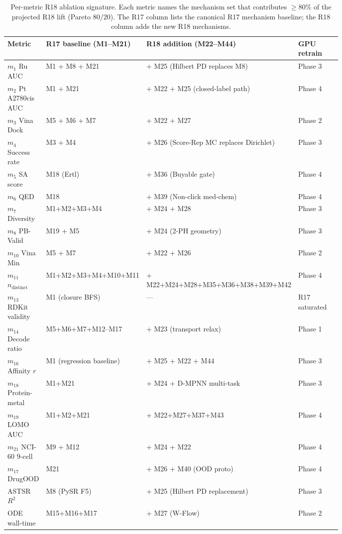 \begin{table}[h]
  \centering
  \small
  \caption{Per-metric R18 ablation signature.  Each metric
  names the mechanism set that contributes $\geq 80\%$ of the
  projected R18 lift (Pareto $80/20$).  The R17 column lists
  the canonical R17 mechanism baseline; the R18 column adds the
  new R18 mechanisms.}
  \label{tab:s6-per-metric}
  \begin{tabular}{lp{0.30\linewidth}p{0.28\linewidth}p{0.20\linewidth}}
    \toprule
    \textbf{Metric} & \textbf{R17 baseline (M1--M21)} &
      \textbf{R18 addition (M22--M44)} & \textbf{GPU retrain} \\
    \midrule
    $m_1$ Ru AUC & M1 + M8 + M21 & + M25 (Hilbert PD replaces M8) & \PROJECTED{} Phase 3 \\
    $m_2$ Pt A2780cis AUC & M1 + M21 & + M22 + M25 (closed-label path) & \PROJECTED{} Phase 4 \\
    $m_3$ Vina Dock & M5 + M6 + M7 & + M22 + M27 & \PROJECTED{} Phase 2 \\
    $m_4$ Success rate & M3 + M4 & + M26 (Score-Rep MC replaces Dirichlet) & \PROJECTED{} Phase 3 \\
    $m_5$ SA score & M18 (Ertl) & + M36 (Buyable gate) & \PROJECTED{} Phase 4 \\
    $m_6$ QED & M18 & + M39 (Non-click med-chem) & \PROJECTED{} Phase 4 \\
    $m_7$ Diversity & M1+M2+M3+M4 & + M24 + M28 & \PROJECTED{} Phase 3 \\
    $m_8$ PB-Valid & M19 + M5 & + M24 (2-PH geometry) & \PROJECTED{} Phase 3 \\
    $m_{10}$ Vina Min & M5 + M7 & + M22 + M26 & \PROJECTED{} Phase 2 \\
    $m_{11}$ $n_{\mathrm{distinct}}$ & M1+M2+M3+M4+M10+M11 & + M22+M24+M28+M35+M36+M38+M39+M42 & \PROJECTED{} Phase 4 \\
    $m_{13}$ RDKit validity & M1 (closure BFS) & --- & \DESIGN{} R17 saturated \\
    $m_{14}$ Decode ratio & M5+M6+M7+M12--M17 & + M23 (transport relax) & \PROJECTED{} Phase 1 \\
    $m_{16}$ Affinity $r$ & M1 (regression baseline) & + M25 + M22 + M44 & \PROJECTED{} Phase 3 \\
    $m_{18}$ Protein-metal & M1+M21 & + M24 + D-MPNN multi-task & \PROJECTED{} Phase 3 \\
    $m_{19}$ LOMO AUC & M1+M2+M21 & + M22+M27+M37+M43 & \PROJECTED{} Phase 4 \\
    $m_{21}$ NCI-60 9-cell & M9 + M12 & + M24 + M22 & \PROJECTED{} Phase 4 \\
    $m_{17}$ DrugOOD & M21 & + M26 + M40 (OOD proto) & \PROJECTED{} Phase 4 \\
    ASTSR $R^{2}$ & M8 (PySR F5) & + M25 (Hilbert PD replacement) & \PROJECTED{} Phase 3 \\
    ODE wall-time & M15+M16+M17 & + M27 (W-Flow) & \PROJECTED{} Phase 2 \\
    \bottomrule
  \end{tabular}
\end{table}

